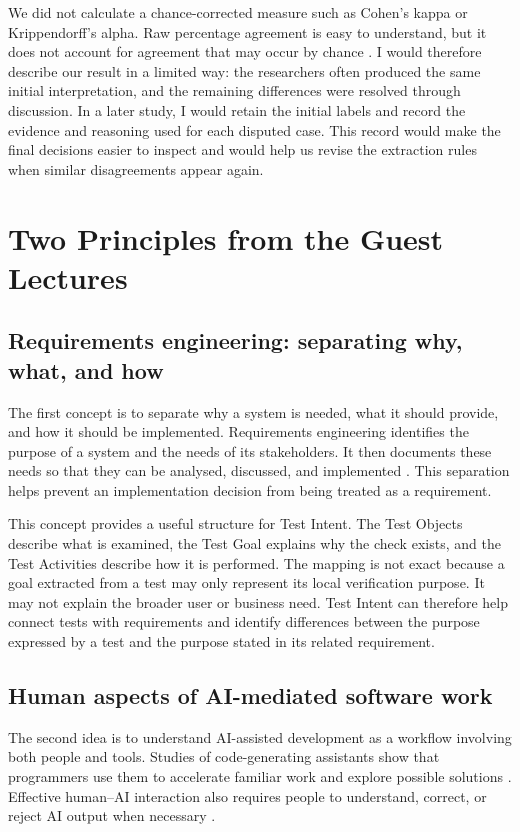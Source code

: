 We did not calculate a chance-corrected measure such as Cohen's kappa or Krippendorff's alpha. Raw percentage agreement is easy to understand, but it does not account for agreement that may occur by chance \cite{artstein-poesio-2008-survey}. I would therefore describe our result in a limited way: the researchers often produced the same initial interpretation, and the remaining differences were resolved through discussion. In a later study, I would retain the initial labels and record the evidence and reasoning used for each disputed case. This record would make the final decisions easier to inspect and would help us revise the extraction rules when similar disagreements appear again.

\section{Two Principles from the Guest Lectures}

\subsection{Requirements engineering: separating why, what, and how}

The first concept is to separate why a system is needed, what it should provide, and how it should be implemented. Requirements engineering identifies the purpose of a system and the needs of its stakeholders. It then documents these needs so that they can be analysed, discussed, and implemented \cite{DBLP:conf/icse/NuseibehE00}. This separation helps prevent an implementation decision from being treated as a requirement.

This concept provides a useful structure for Test Intent. The Test Objects describe what is examined, the Test Goal explains why the check exists, and the Test Activities describe how it is performed. The mapping is not exact because a goal extracted from a test may only represent its local verification purpose. It may not explain the broader user or business need. Test Intent can therefore help connect tests with requirements and identify differences between the purpose expressed by a test and the purpose stated in its related requirement.

\subsection{Human aspects of AI-mediated software work}

The second idea is to understand AI-assisted development as a workflow involving both people and tools. Studies of code-generating assistants show that programmers use them to accelerate familiar work and explore possible solutions \cite{DBLP:journals/pacmpl/BarkeJP23}. Effective human--AI interaction also requires people to understand, correct, or reject AI output when necessary \cite{DBLP:conf/chi/AmershiWVFNCSIB19}.

